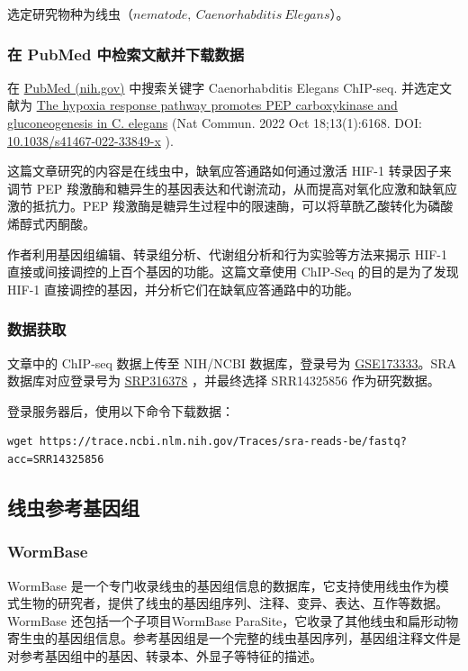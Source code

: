 \documentclass[UTF8]{ctexart}
\begin{document}
选定研究物种为线虫（$nematode,\ Caenorhabditis\ Elegans$）。

\subsubsection{在 PubMed 中检索文献并下载数据}

在 \href{https://pubmed.ncbi.nlm.nih.gov/}{PubMed (nih.gov)} 中搜索关键字 Caenorhabditis Elegans ChIP-seq. 并选定文献为 \href{https://pubmed.ncbi.nlm.nih.gov/36257965/}{The hypoxia response pathway promotes PEP carboxykinase and gluconeogenesis in C. elegans} (Nat Commun. 2022 Oct 18;13(1):6168. DOI: \href{https://doi.org/10.1038/s41467-022-33849-x}{10.1038/s41467-022-33849-x} ).

这篇文章研究的内容是在线虫中，缺氧应答通路如何通过激活 HIF-1 转录因子来调节 PEP 羧激酶和糖异生的基因表达和代谢流动，从而提高对氧化应激和缺氧应激的抵抗力。PEP 羧激酶是糖异生过程中的限速酶，可以将草酰乙酸转化为磷酸烯醇式丙酮酸。

作者利用基因组编辑、转录组分析、代谢组分析和行为实验等方法来揭示 HIF-1 直接或间接调控的上百个基因的功能。这篇文章使用 ChIP-Seq 的目的是为了发现 HIF-1 直接调控的基因，并分析它们在缺氧应答通路中的功能。

\subsubsection{数据获取}

文章中的 ChIP-seq 数据上传至 NIH/NCBI 数据库，登录号为 \href{https://www.ncbi.nlm.nih.gov/geo/query/acc.cgi?acc=GSE173333}{GSE173333}。SRA 数据库对应登录号为 \href{https://www.ncbi.nlm.nih.gov/sra?term=SRP316378}{SRP316378} ，并最终选择 SRR14325856 作为研究数据。

登录服务器后，使用以下命令下载数据：

\begin{lstlisting}
wget https://trace.ncbi.nlm.nih.gov/Traces/sra-reads-be/fastq?acc=SRR14325856
\end{lstlisting}

\subsection{线虫参考基因组}

\subsubsection{WormBase}

WormBase 是一个专门收录线虫的基因组信息的数据库，它支持使用线虫作为模式生物的研究者，提供了线虫的基因组序列、注释、变异、表达、互作等数据。WormBase 还包括一个子项目WormBase ParaSite，它收录了其他线虫和扁形动物寄生虫的基因组信息。参考基因组是一个完整的线虫基因序列，基因组注释文件是对参考基因组中的基因、转录本、外显子等特征的描述。
\end{document}
